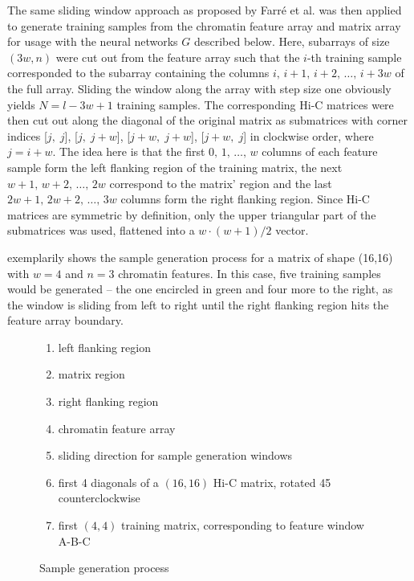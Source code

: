 The same sliding window approach as proposed by Farr\'e et al. \cite{Farre2018a} was then applied to generate training samples 
from the chromatin feature array and matrix array for usage with the neural networks $G$ described below.
Here, subarrays of size $(3w, n)$ were cut out from the feature array 
such that the $i$-th training sample corresponded to the subarray containing the columns $i,\,i+1,\,i+2,\,\dots,\,i+3w$ of the full array. 
Sliding the window along the array with step size one obviously yields $N=l-3w+1$ training samples.
The corresponding Hi-C matrices were then cut out along the diagonal of the original matrix 
as submatrices with corner indices [$j,\;j$], [$j,\;j+w$], [$j+w,\;j+w$], [$j+w,\;j$] in clockwise order, where $j=i+w$.
The idea here is that the first $0,\,1,\,\dots, \,w$ columns of each feature sample form the left flanking region of the training matrix, 
the next $w+1,\,w+2,\,\dots, \,2w$ correspond to the matrix' region and the last $2w+1,\,2w+2,\,\dots, \,3w$ columns form the right flanking region.
Since Hi-C matrices are symmetric by definition, only the upper triangular part of the submatrices was used, 
flattened into a $w\cdot (w+1)/2$ vector.

 exemplarily shows the sample generation process for a matrix of shape (16,16) with $w=4$ and $n=3$ chromatin features.
In this case, five training samples would be generated -- the one encircled in green and four more to the right, as the window is sliding from left to right until the
right flanking region hits the feature array boundary.
\begin{figure}[hbp]
 \begin{minipage}{0.65\textwidth}
    \caption{Sample generation process}
    \label{fig:methods:sample_gen}
 \end{minipage}\hfill
 \begin{minipage}{0.3\textwidth}
 \scriptsize
  \begin{enumerate}[label=\Alph*:,leftmargin=*]
   \raggedright
    \item left flanking region
    \item matrix region
    \item right flanking region
    \item chromatin feature array
    \item sliding direction for sample generation windows
    \item first 4 diagonals of a $(16, 16)$ Hi-C matrix, rotated \SI{45}{\deg} counterclockwise
    \item first $(4, 4)$ training matrix, corresponding to feature window A-B-C
\end{enumerate}
 \end{minipage}
\end{figure}

